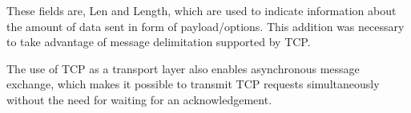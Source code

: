 These fields are, Len and Length, which are used to indicate information about the amount of data sent in form of payload/options.  
This addition was necessary to take advantage of message delimitation supported by TCP.

The use of TCP as a transport layer also enables asynchronous message exchange, which makes it possible to transmit TCP requests simultaneously without the need for waiting for an acknowledgement. 

%
%
%





% 
%
%
%
%
%



